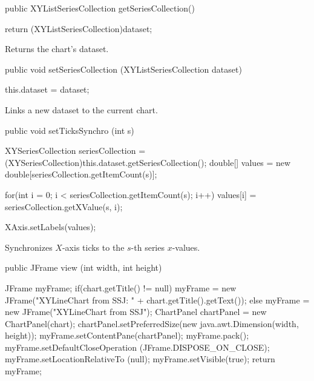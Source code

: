\begin{htmlonly}
\end{htmlonly}
\begin{code}

   public XYListSeriesCollection getSeriesCollection() \begin{hide} {
      return (XYListSeriesCollection)dataset;
   }\end{hide}
\end{code}
\begin{tabb}
   Returns the chart's dataset.
\end{tabb}
\begin{htmlonly}
\end{htmlonly}
\begin{code}

   public void setSeriesCollection (XYListSeriesCollection dataset) \begin{hide} {
      this.dataset = dataset;
   }\end{hide}
\end{code}
\begin{tabb}
   Links a new dataset to the current chart.
\end{tabb}
\begin{htmlonly}
\end{htmlonly}
\begin{code}

   public void setTicksSynchro (int s) \begin{hide} {
      XYSeriesCollection seriesCollection =
          (XYSeriesCollection)this.dataset.getSeriesCollection();
      double[] values = new double[seriesCollection.getItemCount(s)];

      for(int i = 0; i < seriesCollection.getItemCount(s); i++)
         values[i] = seriesCollection.getXValue(s, i);

      XAxis.setLabels(values);
   }\end{hide}
\end{code}
\begin{tabb}
   Synchronizes $X$-axis ticks to the $s$-th series $x$-values.
\end{tabb}
\begin{htmlonly}
\end{htmlonly}
\begin{code}

   public JFrame view (int width, int height) \begin{hide} {
      JFrame myFrame;
      if(chart.getTitle() != null)
         myFrame = new JFrame("XYLineChart from SSJ: " + chart.getTitle().getText());
      else
         myFrame = new JFrame("XYLineChart from SSJ");
      ChartPanel chartPanel = new ChartPanel(chart);
      chartPanel.setPreferredSize(new java.awt.Dimension(width, height));
      myFrame.setContentPane(chartPanel);
      myFrame.pack();
      myFrame.setDefaultCloseOperation (JFrame.DISPOSE_ON_CLOSE);
      myFrame.setLocationRelativeTo (null);
      myFrame.setVisible(true);
      return myFrame;
   }\end{hide}
\end{code}
